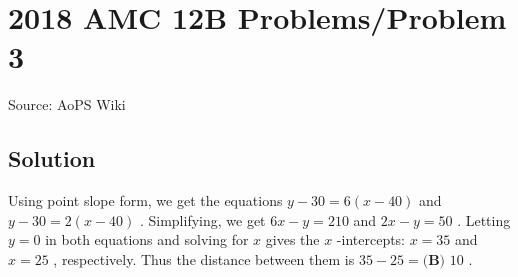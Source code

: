 \documentclass[12pt]{article}
\begin{document}
\section*{{2018 AMC 12B Problems/Problem 3}}
Source: AoPS Wiki

\subsection*{Solution}
Using point slope form, we get the equations $y-30 = 6(x-40)$ and $y-30 = 2(x-40)$ . Simplifying, we get $6x-y=210$ and $2x-y=50$ . Letting $y=0$ in both equations and solving for $x$ gives the $x$ -intercepts: $x=35$ and $x=25$ , respectively. Thus the distance between them is $35-25=\boxed{\textbf{(B) } 10}$ .
\end{document}
